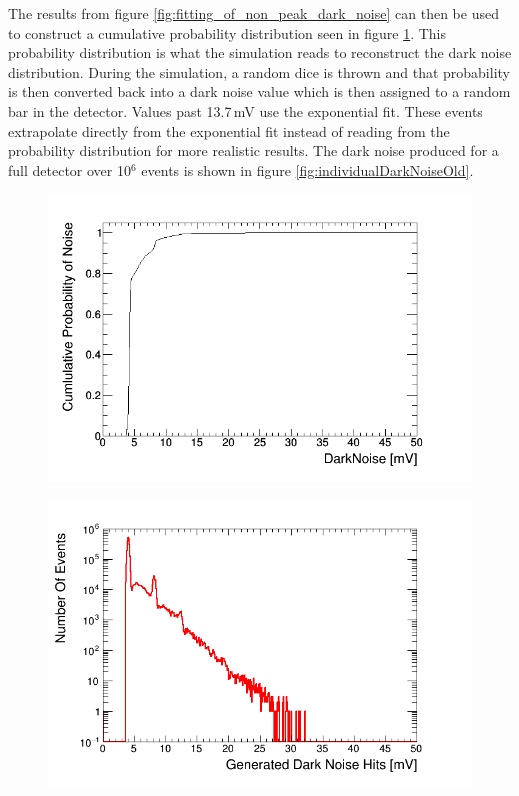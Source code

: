 The results from figure \ref{fig:fitting_of_non_peak_dark_noise} can then be used to construct a cumulative probability distribution seen in figure \ref{fig:cumulative_prob_dark}. This probability distribution is what the simulation reads to reconstruct the dark noise distribution. During the simulation, a random dice is thrown and that probability is then converted back into a dark noise value which is then assigned to a random bar in the detector. Values past 13.7\,mV use the exponential fit. These events extrapolate directly from the exponential fit instead of reading from the probability distribution for more realistic results. The dark noise produced for a full detector over 10$^6$ events is shown in figure \ref{fig:individualDarkNoiseOld}. 

\begin{figure}[!h]
\centering
\begin{minipage}{.45\textwidth}
  \centering
  \includegraphics[width=\linewidth]{cumulative_prob_dark_noise.png}
  \label{fig:cumulative_prob_dark}
\end{minipage}%
\qquad
\begin{minipage}{.45\textwidth}
  \centering
  \includegraphics[width=\linewidth]{Chapter4/Figs/darkNoiseLog.png} 

\end{minipage}
\end{figure}
